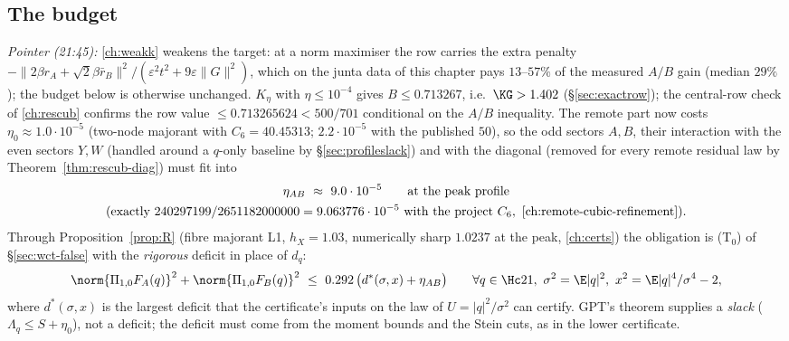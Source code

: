\subsection{The budget}\label{sec:ab-budget}
\emph{Pointer (21:45):} \autoref{ch:weakk} weakens the target: at a norm maximiser the row carries the extra penalty $-\|2\beta r_A+\sqrt2\beta\bar r_B\|^2/(\varepsilon^2t^2+9\varepsilon\|G\|^2)$, which on the junta data of this chapter pays $13$--$57\%$ of the measured $A/B$ gain (median $29\%$); the budget below is otherwise unchanged.
$K_\eta$ with $\eta\le10^{-4}$ gives $B\le0.713267$, i.e.\ $\KG>1.402$ (\S\ref{sec:exactrow}); the central-row check of \autoref{ch:rescub} confirms the row value
$\le0.713265624<500/701$ conditional on the $A/B$ inequality. The remote part now costs $\eta_0\approx1.0\cdot10^{-5}$ (two-node majorant with $C_6=40.45313$; $2.2\cdot10^{-5}$ with
the published $50$), so the odd sectors $A,B$, their interaction with the even sectors $Y,W$ (handled around a $q$-only baseline by \S\ref{sec:profileslack}) and with the
diagonal (removed for every remote residual law by Theorem~\ref{thm:rescub-diag}) must fit into
\[\begin{gathered}
\eta_{AB}\ \approx\ 9.0\cdot10^{-5}\qquad\text{at the peak profile}\\
(\text{exactly }240297199/2651182000000=9.063776\cdot10^{-5}\text{ with the project }C_6,\ \text{\autoref{ch:remote-cubic-refinement}}).
\end{gathered}\]
Through Proposition~\ref{prop:R} (fibre majorant L1, $h_X=1.03$, numerically sharp $1.0237$ at the peak, \autoref{ch:certs}) the obligation is (T$_0$) of
\S\ref{sec:wct-false} with the \emph{rigorous} deficit in place of $d_q$:
\begin{equation}\label{eq:T0rig}
\norm{\Pi_{1,0}F_A(q)}^2+\norm{\Pi_{1,0}F_B(q)}^2\ \le\ 0.292\,\bigl(d^*(\sigma,x)+\eta_{AB}\bigr)\qquad\forall q\in\Hc21,\ \sigma^2=\E|q|^2,\ x^2=\E|q|^4/\sigma^4-2,
\end{equation}
where $d^*(\sigma,x)$ is the largest deficit that the certificate's inputs on the law of $U=|q|^2/\sigma^2$ can certify. GPT's theorem supplies a \emph{slack} ($\Lambda_q\le S+\eta_0$),
not a deficit; the deficit must come from the moment bounds and the Stein cuts, as in the lower certificate.

